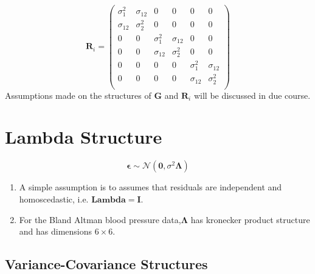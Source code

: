 \documentclass[12pt, a4paper]{article}
\begin{document}
\[
\boldsymbol{R}_i = \left(
\begin{array}{cccccc}
\sigma^2_{1} & \sigma_{12} & 0 & 0 & 0 & 0 \\
\sigma_{12} & \sigma^2_{2} & 0 & 0 & 0 & 0 \\
0 & 0 & \sigma^2_{1} & \sigma_{12} & 0 & 0 \\
0 & 0 & \sigma_{12} & \sigma^2_{2} & 0 & 0 \\
0 & 0 & 0 & 0 & \sigma^2_{1} & \sigma_{12} \\
0 & 0 & 0 & 0 & \sigma_{12} & \sigma^2_{2} \\
\end{array} \right)
\]
Assumptions made on the structures of $\boldsymbol{G}$ and $\boldsymbol{R}_i$ will be discussed in due course.















\newpage












\section{Lambda Structure}

\begin{equation}
\boldsymbol{\epsilon} \sim \mathcal{N}(\boldsymbol{0},\sigma^2 \boldsymbol{\Lambda})
\end{equation}
\begin{enumerate}
	\item A simple assumption is to assumes that residuals are independent and homoscedastic, i.e. $\boldsymbol{Lambda = I}$.
	
	\item For the Bland Altman blood pressure data,$\boldsymbol{\Lambda}$ has kronecker product structure
	and has dimensions $6 \times 6$.
\end{enumerate}



\subsection{Variance-Covariance Structures}
\end{document}

